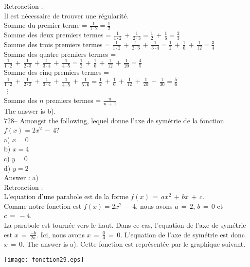 ﻿\documentclass[letterpaper, 12pt]{article}
\begin{document}
Retroaction : \\
Il est n\'ecessaire de trouver une r\'egularit\'e. \\
Somme du premier terme = $\frac{1}{1\cdot2}=\frac{1}{2}$\\[2mm]
Somme des deux premiers termes =
$\frac{1}{1\cdot2}\,+\,\frac{1}{2\cdot3}=\frac{1}{2}\,+\,\frac{1}{6}=\frac{2}{3}$\\[2mm]
Somme des trois premiers termes =
$\frac{1}{1\cdot2}\,+\,\frac{1}{2\cdot3}\,+\,\frac{1}{3\cdot4}=\frac{1}{2}\,+\,\frac{1}{6}\,+\,\frac{1}{12}=\frac{3}{4}$\\[2mm]
Somme des quatre premiers termes =
$\frac{1}{1\cdot2}\,+\,\frac{1}{2\cdot3}\,+\,\frac{1}{3\cdot4}\,+\,\frac{1}{4\cdot5}=\frac{1}{2}\,+\,\frac{1}{6}\,+\,\frac{1}{12}\,+\,\frac{1}{20}=\frac{4}{5}$\\[2mm]
Somme des cinq premiers termes =
$\frac{1}{1\cdot2}\,+\,\frac{1}{2\cdot3}\,+\,\frac{1}{3\cdot4}\,+\,\frac{1}{4\cdot5}\,+\,\frac{1}{5\cdot6}=\frac{1}{2}\,+\,\frac{1}{6}\,+\,\frac{1}{12}\,+\,\frac{1}{20}\,+\,\frac{1}{30}=\frac{5}{6}$\\
\vdots\\
Somme des $n$ premiers termes = $\frac{n}{n\,+\,1}$\\[2mm]
The answer is b).\\

728-- Amongst the following, lequel donne l'axe de sym\'etrie de
la fonction $f(x)= 2x^{2}\,-\,4$?\\
a) $x=0$\\
b) $x=4$\\
c) $y=0$\\
d) $y=2$\\

Answer : a)\\

Retroaction : \\
L'equation d'une parabole est de la forme
$f(x)\,=\,ax^2\,+\,bx\,+\,c$.\\
Comme notre fonction est $f(x)= 2x^{2}\,-\,4$, nous avons $a\,=\,2$,
$b\,=\,0$ et $c\,=\,-4$.\\
La parabole est tourn\'ee vers le haut. Dans ce cas, l'equation de
l'axe de sym\'etrie est $x\,=\, \frac{-b}{2a}$. Ici, nous avons
$x\,=\,\frac{0}{4}\,=\,0$. L'equation de l'axe de sym\'etrie est
donc $x\,=\,0$. The answer is a).
Cette fonction est repr\'esent\'ee par le graphique suivant.\\
    \begin{center}
    \texttt{[image: fonction29.eps]}
    \end{center}
\end{document}
